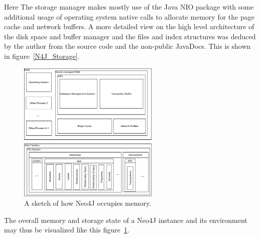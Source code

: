         Here The storage manager makes mostly use of the Java NIO package with some additional usage of operating system native calls to allocate memory for the page cache and network buffers. 
        A more detailed view on the high level architecture of the disk space and buffer manager and the files and index structures was deduced by the author from the source code and the non-public JavaDocs.
        This is shown in figure~\ref{N4J_Storage}.
        
      \begin{figure}[htp]\label{N4J_memory_view}
        \begin{center}
        \includegraphics[keepaspectratio,width=0.6\textwidth]{img/00_intro/N4J_memory_view.png}
        \end{center}
        \caption{A sketch of how Neo4J occupies memory.} %
        \end{figure}
        
        The overall memory and storage state of a Neo4J instance and its environment may thus be visualized like this figure~\ref{N4J_memory_view}.

